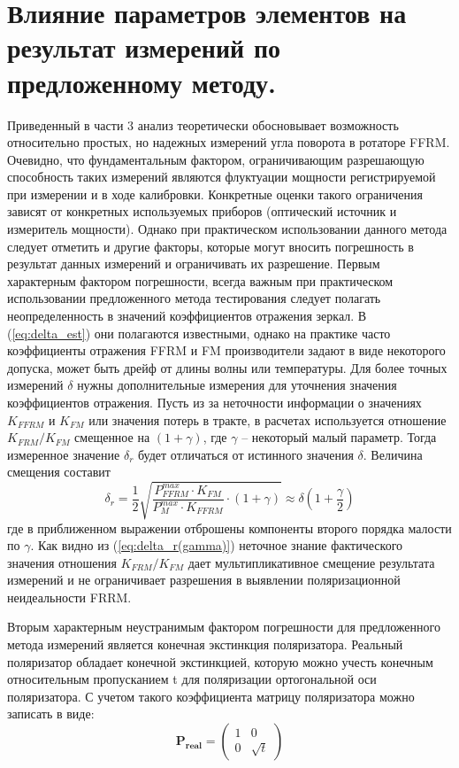 \documentclass{article}
\begin{document}
\section{Влияние параметров элементов на результат измерений по предложенному методу.}

Приведенный в части 3 анализ теоретически обосновывает возможность относительно простых, но надежных измерений угла поворота в ротаторе FFRM.
Очевидно, что фундаментальным фактором, ограничивающим разрешающую способность таких измерений являются флуктуации мощности регистрируемой при измерении и в ходе калибровки.
Конкретные оценки такого ограничения зависят от конкретных используемых приборов (оптический источник и измеритель мощности).
Однако при практическом использовании данного метода следует отметить и другие факторы, которые могут вносить погрешность в результат данных измерений и ограничивать их разрешение.   
Первым характерным фактором погрешности, всегда важным при практическом использовании предложенного метода тестирования следует полагать неопределенность в значений коэффициентов отражения зеркал.
В (\ref{eq:delta_est}) они полагаются известными, однако на практике часто коэффициенты отражения FFRM и FM производители задают в виде некоторого допуска, может быть дрейф от длины волны или температуры.
Для более точных измерений $\delta$ нужны дополнительные измерения для уточнения значения коэффициентов отражения.
Пусть из за неточности информации о значениях $K_{FFRM}$ и $K_{FM}$ или значения потерь в тракте, в расчетах используется отношение $K_{FRM}/K_{FM}$ смещенное на $(1 + \gamma)$, где $\gamma$ – некоторый малый параметр.
Тогда измеренное значение $\delta_r$ будет отличаться от истинного значения $\delta$.
Величина смещения составит    
\begin{equation}
    \label{eq:delta_r(gamma)}
    \delta_r =\frac{1}{2}\sqrt{\frac{P_{FFRM}^{max}\cdot K_{FM}}{P_M^{max}\cdot K_{FFRM}}\cdot(1+\gamma)}\approx \delta\left(1+\frac{\gamma}{2}\right)
\end{equation}
где в приближенном выражении отброшены компоненты второго порядка малости по $\gamma$.
Как видно из (\ref{eq:delta_r(gamma)}) неточное знание фактического значения отношения $K_{FRM}/K_{FM}$ дает мультипликативное смещение результата измерений и не ограничивает разрешения в выявлении поляризационной неидеальности FRRM.

Вторым характерным неустранимым фактором погрешности для предложенного метода измерений является конечная экстинкция поляризатора. Реальный поляризатор обладает конечной экстинкцией, которую можно учесть конечным относительным пропусканием t для поляризации ортогональной оси поляризатора. С учетом такого коэффициента матрицу поляризатора можно записать в виде:
\begin{equation}
	\bm{P_{real}} = 
	\begin{pmatrix}
		1 & 0 \\
		0 & \sqrt{t}
	\end{pmatrix}	
\end{equation}
\end{document}
